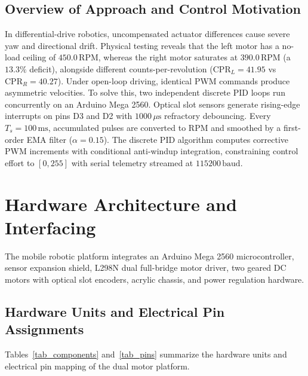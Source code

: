 \documentclass[11pt,a4paper]{article}
\begin{document}
\subsection{Overview of Approach and Control Motivation}
In differential-drive robotics, uncompensated actuator differences cause severe yaw and directional drift. Physical testing reveals that the left motor has a no-load ceiling of $450.0\,\text{RPM}$, whereas the right motor saturates at $390.0\,\text{RPM}$ (a $13.3\%$ deficit), alongside different counts-per-revolution ($\text{CPR}_L = 41.95$ vs $\text{CPR}_R = 40.27$). Under open-loop driving, identical PWM commands produce asymmetric velocities. To solve this, two independent discrete PID loops run concurrently on an Arduino Mega 2560. Optical slot sensors generate rising-edge interrupts on pins D3 and D2 with $1000\,\mu\text{s}$ refractory debouncing. Every $T_s = 100\,\text{ms}$, accumulated pulses are converted to RPM and smoothed by a first-order EMA filter ($\alpha = 0.15$). The discrete PID algorithm computes corrective PWM increments with conditional anti-windup integration, constraining control effort to $[0, 255]$ with serial telemetry streamed at $115200\,\text{baud}$.

\section{Hardware Architecture and Interfacing}
The mobile robotic platform integrates an Arduino Mega 2560 microcontroller, sensor expansion shield, L298N dual full-bridge motor driver, two geared DC motors with optical slot encoders, acrylic chassis, and power regulation hardware.

\subsection{Hardware Units and Electrical Pin Assignments}
Tables~\ref{tab_components} and~\ref{tab_pins} summarize the hardware units and electrical pin mapping of the dual motor platform.
\end{document}
